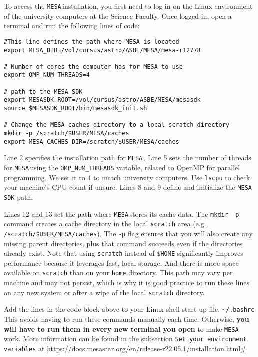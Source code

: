 \documentclass[11pt,a4paper]{article}
\newcommand{\MESA}{\texttt{MESA}\,}
\begin{document}
\bigskip\noindent
To access the \MESA installation, you first need to log in on the Linux environment of the university computers at the Science Faculty. 
%
Once logged in, open a terminal and run the following lines of code:
\begin{lstlisting}
#This line defines the path where MESA is located 
export MESA_DIR=/vol/cursus/astro/ASBE/MESA/mesa-r12778

# Number of cores the computer has for MESA to use
export OMP_NUM_THREADS=4

# path to the MESA SDK
export MESASDK_ROOT=/vol/cursus/astro/ASBE/MESA/mesasdk
source $MESASDK_ROOT/bin/mesasdk_init.sh

# Change the MESA caches directory to a local scratch directory
mkdir -p /scratch/$USER/MESA/caches
export MESA_CACHES_DIR=/scratch/$USER/MESA/caches
\end{lstlisting}

Line 2 specifies the installation path for \MESA. 
Line 5 sets the number of threads for \MESA using the \texttt{OMP\_NUM\_THREADS} variable, related to OpenMP for parallel programming. We set it to 4 to match university computers. 
Use \texttt{lscpu} to check your machine's CPU count if unsure. 
Lines 8 and 9 define and initialize the \texttt{MESA SDK} path.


Lines 12 and 13 set the path where \MESA stores its cache data. 
The \texttt{mkdir -p} command creates a cache directory in the local \texttt{scratch} area (e.g., \texttt{/scratch/\$USER/MESA/caches}). The \texttt{-p} flag ensures that you will also create any missing parent directories, plus that command succeeds even if the directories already exist.
%
Note that using \texttt{scratch} instead of \texttt{\$HOME} significantly improves performance because it leverages fast, local storage. And there is more space available on \texttt{scratch} than on your \texttt{home} directory. This path may vary per machine and may not persist, which is why it is good practice to run these lines on any new system or after a wipe of the local \texttt{scratch} directory.



\begin{tcolorbox}[protipbox]
Add the lines in the code block above to your Linux shell start-up file: \verb|~/.bashrc|
This avoids having to run these commands manually each time. Otherwise, \textbf{you will have to run them in every new terminal you open} to make \MESA work. 
More information can be found in the subsection \texttt{Set your environment variables} at \url{https://docs.mesastar.org/en/release-r22.05.1/installation.html\#}.
\end{tcolorbox}
\end{document}
